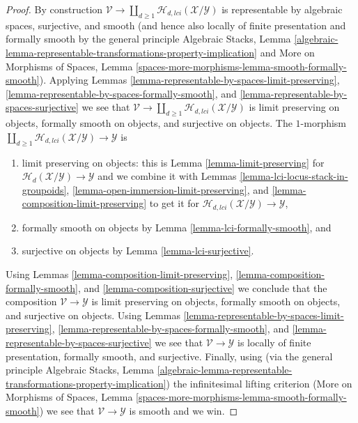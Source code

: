 \documentclass{stacks-project}
\theoremstyle{plain}
\theoremstyle{definition}
\theoremstyle{remark}
\numberwithin{equation}{subsection}
\begin{document}
\begin{proof}
\medskip\noindent
By construction $\mathcal{V} \to
\coprod\nolimits_{d \geq 1} \mathcal{H}_{d, lci}(\mathcal{X}/\mathcal{Y})$
is representable by algebraic spaces, surjective, and smooth (and hence
also locally of finite presentation and formally smooth by the general
principle
Algebraic Stacks, Lemma
\ref{algebraic-lemma-representable-transformations-property-implication}
and
More on Morphisms of Spaces,
Lemma \ref{spaces-more-morphisms-lemma-smooth-formally-smooth}).
Applying
Lemmas \ref{lemma-representable-by-spaces-limit-preserving},
\ref{lemma-representable-by-spaces-formally-smooth}, and
\ref{lemma-representable-by-spaces-surjective}
we see that $\mathcal{V} \to
\coprod\nolimits_{d \geq 1} \mathcal{H}_{d, lci}(\mathcal{X}/\mathcal{Y})$
is limit preserving on objects, formally smooth on objects, and
surjective on objects. The $1$-morphism
$\coprod\nolimits_{d \geq 1} \mathcal{H}_{d, lci}(\mathcal{X}/\mathcal{Y})
\to \mathcal{Y}$ is
\begin{enumerate}
\item limit preserving on objects: this is
Lemma \ref{lemma-limit-preserving}
for $\mathcal{H}_d(\mathcal{X}/\mathcal{Y}) \to \mathcal{Y}$
and we combine it with Lemmas
\ref{lemma-lci-locus-stack-in-groupoids},
\ref{lemma-open-immersion-limit-preserving}, and
\ref{lemma-composition-limit-preserving}
to get it for $\mathcal{H}_{d, lci}(\mathcal{X}/\mathcal{Y}) \to \mathcal{Y}$,
\item formally smooth on objects by
Lemma \ref{lemma-lci-formally-smooth},
and
\item surjective on objects by
Lemma \ref{lemma-lci-surjective}.
\end{enumerate}
Using
Lemmas \ref{lemma-composition-limit-preserving},
\ref{lemma-composition-formally-smooth}, and
\ref{lemma-composition-surjective}
we conclude that the composition $\mathcal{V} \to \mathcal{Y}$ is
limit preserving on objects, formally smooth on objects, and
surjective on objects.
Using
Lemmas \ref{lemma-representable-by-spaces-limit-preserving},
\ref{lemma-representable-by-spaces-formally-smooth}, and
\ref{lemma-representable-by-spaces-surjective}
we see that $\mathcal{V} \to \mathcal{Y}$ is
locally of finite presentation, formally smooth, and surjective.
Finally, using (via the general principle
Algebraic Stacks,
Lemma \ref{algebraic-lemma-representable-transformations-property-implication})
the infinitesimal lifting criterion
(More on Morphisms of Spaces, Lemma
\ref{spaces-more-morphisms-lemma-smooth-formally-smooth})
we see that $\mathcal{V} \to \mathcal{Y}$ is smooth and we win.
\end{proof}
\end{document}

